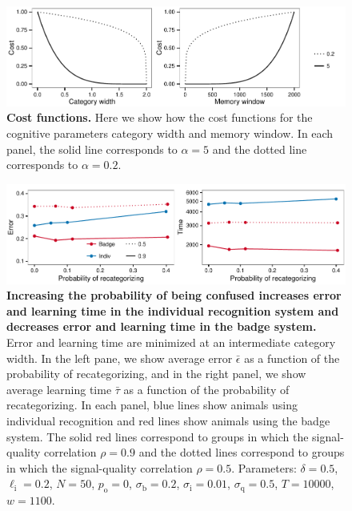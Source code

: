 \begin{figure}[h]
\includegraphics[width=.8\textwidth]{figures/cost_functions.pdf}
\caption{\sffamily\small\textbf{Cost functions.} Here we show how the cost functions for the cognitive parameters category width and memory window. In each panel, the solid line corresponds to $\alpha=5$ and the dotted line corresponds to $\alpha=0.2$. }
\label{cost_fx}
\end{figure}

\begin{figure}[h]
\includegraphics[width=6.85in]{figures/confusion_probs.pdf}
\caption{\sffamily\small\textbf{Increasing the probability of being confused increases error and learning time in the individual recognition system and decreases error and learning time in the badge system.} Error and learning time are minimized at an intermediate category width. In the left pane, we show average error $\bar{\epsilon}$ as a function of the probability of recategorizing, and in the right panel, we show average learning time $\bar{\tau}$ as a function of the probability of recategorizing. In each panel, blue lines show animals using individual recognition and red lines show animals using the badge system. The solid red lines correspond to groups in which the signal-quality correlation $\rho=0.9$ and the dotted lines correspond to groups in which the signal-quality correlation $\rho=0.5$. Parameters: $\delta = 0.5$, $\ell_\text{i}=0.2$, $N=50$, $p_\text{o}=0$, $\sigma_\text{b}=0.2$, $\sigma_\text{i}=0.01$, $\sigma_\text{q}=0.5$, $T=10000$, $w=1100$.}
\label{confusion_probs}
\end{figure}

